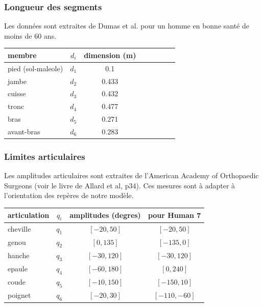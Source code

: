 \documentclass[a4paper, 10pt ]{article}
\begin{document}
\subsubsection{Longueur des segments}
Les données sont extraites de Dumas et al. \cite{Dumas07} pour un homme en bonne santé de moins de $60$ ans.

\begin{center}
\small{
\begin{tabular}{l |c |c| c| c| c| c|c}
membre & $d_i$ & dimension (m)\\
\hline
pied 	(sol-maleole)		& $d_1$&0.1\\
jambe 			& $d_2$&0.433\\
cuisse 			& $d_3$&0.432\\
tronc			& $d_4$&0.477\\
bras				& $d_5$&0.271\\
avant-bras	&$ d_6$ &0.283\\
\end{tabular}}
\end{center}





\subsubsection{Limites articulaires}

Les amplitudes articulaires sont extraites de l'American Academy of Orthopaedic Surgeons (voir le livre de Allard et al\cite{Allard11}, p34). Ces mesures sont à adapter à l'orientation des repères de notre modèle.

\begin{center}
\small{
\begin{tabular}{l |c |c| c|}
articulation & $q_i$ & amplitudes (degres) & pour Human 7\\
\hline
cheville		& $q_1$&$[-20,50]$ & $[-20,50]$\\
genou 			& $q_2$&$[0,135]$ & $[-135,0]$\\
hanche 		& $q_3$&$[-30,120]$&$[-30,120]$\\
epaule			& $q_4$&$[-60,180]$&$[0,240]$\\
coude		    & $q_5$&$[-10,150]$&$[-150,10]$\\
poignet	    &$ q_6$ &$[-20,30]$&$[-110,-60]$\\
\end{tabular}}
\end{center}
\end{document}
